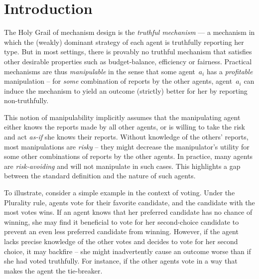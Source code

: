 \section{Introduction}

The Holy Grail of mechanism design is the \emph{truthful mechanism} --- a mechanism in which the (weakly) dominant strategy of each agent is truthfully reporting her type.
But in most settings, there is provably no truthful mechanism that satisfies other desirable properties such as budget-balance, efficiency or fairness. 
% 
Practical mechanisms are thus \emph{manipulable} in the sense that some agent~$a_i$ has a \emph{profitable} manipulation -- for \emph{some} combination of reports by the other agents, agent~$a_i$ can induce the mechanism to yield an outcome (strictly) better for her by reporting non-truthfully.


% 
% 


This notion of manipulability implicitly assumes that the manipulating agent either knows the reports made by all other agents, or is willing to take the risk and act \emph{as-if} she knows their reports. 
Without knowledge of the others' reports, most manipulations are \emph{risky} -- they might decrease the manipulator's utility for some other combinations of reports by the other agents.
In practice, many agents are \emph{risk-avoiding} and will not manipulate in such cases. 
This highlights a gap between the standard definition and the nature of such agents. 
%
%

To illustrate, consider a simple example in the context of voting. Under the Plurality rule, agents vote for their favorite candidate, and the candidate with the most votes wins. If an agent knows that her preferred candidate has no chance of winning, she may find it beneficial to vote for her second-choice candidate to prevent an even less preferred candidate from winning. However, if the agent lacks precise knowledge of the other votes and decides to vote for her second choice, it may backfire -- she might inadvertently cause an outcome worse than if she had voted truthfully. For instance, if the other agents vote in a way that makes the agent the tie-breaker.


